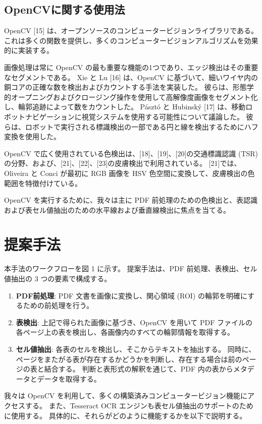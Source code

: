 \documentclass[uplatex, twocolumn,10pt]{jsarticle}
\begin{document}
\subsection{OpenCVに関する使用法}
OpenCV [15] は、オープンソースのコンピュータービジョンライブラリである。
これは多くの関数を提供し、多くのコンピュータービジョンアルゴリズムを効果的に実装する。

画像処理は常に OpenCV の最も重要な機能の1つであり、エッジ検出はその重要なセグメントである。
Xie と Lu [16] は、OpenCV に基づいて、細いワイヤ内の銅コアの正確な数を検出およびカウントする手法を実装した。
彼らは、形態学的オープニングおよびクロージング操作を使用して高解像度画像をセグメント化し、輪郭追跡によって数をカウントした。
Pásztó と Hubinský [17] は、移動ロボットナビゲーションに視覚システムを使用する可能性について議論した。
彼らは、ロボットで実行される標識検出の一部である円と線を検出するためにハフ変換を使用した。

OpenCV で広く使用されている色検出は、[18]、[19]、[20]の交通標識認識 (TSR) の分野、および、[21]、[22]、[23]の皮膚検出で利用されている。
[21]では、Oliveira と Conci が最初に RGB 画像を HSV 色空間に変換して、皮膚検出の色範囲を特徴付けている。

OpenCV を実行するために、我々は主に PDF 前処理のための色検出と、表認識および表セル値抽出のための水平線および垂直線検出に焦点を当てる。


\section{提案手法}
本手法のワークフローを図 1 に示す。
提案手法は、PDF 前処理、表検出、セル値抽出の 3 つの要素で構成する。

\begin{enumerate}
    \item \textbf{PDF前処理}:
    PDF 文書を画像に変換し、関心領域 (ROI) の輪郭を明確にするための前処理を行う。
    \item \textbf{表検出}:
    上記で得られた画像に基づき、OpenCV を用いて PDF ファイルの各ページ上の表を検出し、各画像内のすべての輪郭情報を取得する。
    \item \textbf{セル値抽出}:
    各表のセルを検出し、そこからテキストを抽出する。
    同時に、ページをまたがる表が存在するかどうかを判断し、存在する場合は前のページの表と結合する。
    判断と表形式の解釈を通じて、PDF 内の表からメタデータとデータを取得する。
\end{enumerate}

我々は OpenCV を利用して、多くの構築済みコンピュータービジョン機能にアクセスする。
また、Tesseract OCR エンジンも表セル値抽出のサポートのために使用する。
具体的に、それらがどのように機能するかを以下で説明する。
\end{document}
